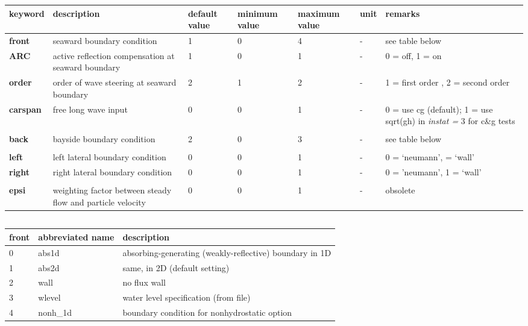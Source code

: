 \begin{tabular}{|p{0.5in}|p{0.9in}|p{0.4in}|p{0.5in}|p{0.5in}|p{0.3in}|p{0.7in}|} \hline 
keyword & description & default value & minimum value & maximum value & unit & remarks \\ \hline 
\textbf{front    } & seaward boundary condition & 1 & 0 & 4 & - & see table below \\ \hline 
\textbf{ARC      } & active reflection compensation at seaward boundary & 1 & 0 & 1 & - & 0 = off, 1 = on \\ \hline 
\textbf{order   } & order of wave steering at seaward boundary & 2 & 1 & 2 & - & 1 = first order , 2 = second order  \\ \hline 
\textbf{carspan} & free long wave input & 0 & 0 & 1 & - & 0 = use cg (default); 1 = use sqrt(gh) in \textit{instat =} 3 for c\&g tests \\ \hline 
\textbf{} &  &  &  &  &  &  \\ \hline 
\textbf{back     } & bayside boundary condition & 2 & 0 & 3 & - & see table below \\ \hline 
\textbf{} &  &  &  &  &  &  \\ \hline 
\textbf{left     } & left lateral boundary condition & 0 & 0 & 1 & - & 0 = `neumann', \newline 1 = `wall' \\ \hline 
\textbf{right    } & right lateral boundary condition & 0 & 0 & 1 & - & 0 = 'neumann', 1 = `wall' \\ \hline 
\textbf{} &  &  &  &  &  &  \\ \hline 
\textbf{epsi    } & weighting factor between steady flow and particle velocity & 0 & 0 & 1 & - & obsolete \\ \hline 
\end{tabular}
\subsection{}

\begin{tabular}{|p{0.5in}|p{0.8in}|p{2.6in}|} \hline 
front & abbreviated name & description \\ \hline 
0 & abs1d & absorbing-generating (weakly-reflective) boundary in 1D \\ \hline 
1 & abs2d & same, in 2D (default setting) \\ \hline 
2 & wall & no flux wall \\ \hline 
3 & wlevel & water level specification (from file) \\ \hline 
4 & nonh\_1d & boundary condition for nonhydrostatic option \\ \hline 
\end{tabular}

